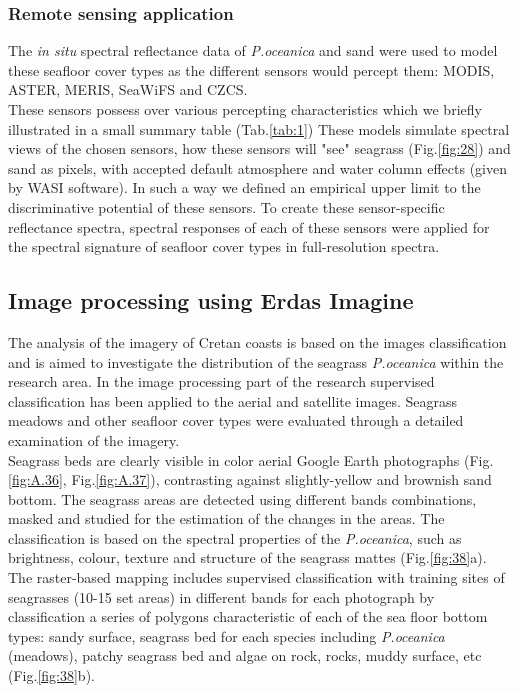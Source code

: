 \documentclass[11pt]{article}
\begin{document}
\subsubsection{Remote sensing application}
The \textit{in situ} spectral reflectance data of \textit{P.oceanica} and sand were used to model these seafloor cover
types as the different sensors would percept them: MODIS, ASTER, MERIS, SeaWiFS and \ac{CZCS}.\\
These sensors possess over various percepting characteristics which we briefly illustrated in a small summary table (Tab.\ref{tab:1})
These models simulate spectral views of the chosen sensors, how these sensors will "see" seagrass (Fig.\ref{fig:28}) and sand as
pixels, with accepted default atmosphere and water column effects (given by WASI software). In such
a way we defined an empirical upper limit to the discriminative potential of these sensors. To create
these sensor-specific reflectance spectra, spectral responses of each of these sensors were applied for
the spectral signature of seafloor cover types in full-resolution spectra.

\subsection{Image processing using Erdas Imagine}
The analysis of the imagery of Cretan coasts is based on the images classification and is aimed to
investigate the distribution of the seagrass \textit{P.oceanica} within the research area.
In the image processing part of the research supervised classification has been applied to the aerial
and satellite images. Seagrass meadows and other seafloor cover types were evaluated through a
detailed examination of the imagery. \\
Seagrass beds are clearly visible in color aerial Google Earth
photographs (Fig.\ref{fig:A.36}, Fig.\ref{fig:A.37}), contrasting against slightly-yellow and brownish sand bottom. The seagrass areas are
detected using different bands combinations, masked and studied for the estimation of the changes in
the areas. The classification is based on the spectral properties of the \textit{P.oceanica}, such as brightness,
colour, texture and structure of the seagrass mattes (Fig.\ref{fig:38}a). The raster-based mapping
includes supervised classification with training sites of seagrasses (10-15 set areas) in different bands
for each photograph by classification a series of polygons characteristic of each of the sea floor
bottom types: sandy surface, seagrass bed for each species including \textit{P.oceanica} (meadows), patchy
seagrass bed and algae on rock, rocks, muddy surface, etc (Fig.\ref{fig:38}b).
\end{document}
